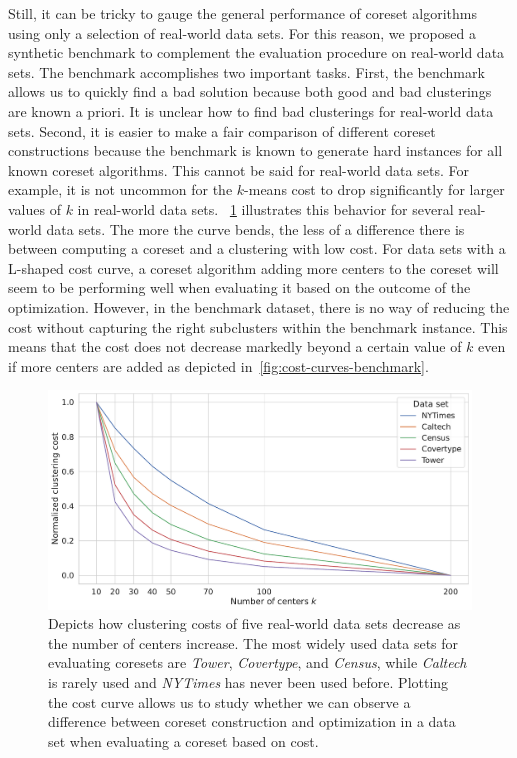 Still, it can be tricky to gauge the general performance of coreset algorithms using only a selection of real-world data sets. For this reason, we proposed a synthetic benchmark to complement the evaluation procedure on real-world data sets. The benchmark accomplishes two important tasks.
% 
First, the benchmark allows us to quickly find a bad solution because both good and bad clusterings are known a priori. It is unclear how to find bad clusterings for real-world data sets.
% 
Second, it is easier to make a fair comparison of different coreset constructions because the benchmark is known to generate hard instances for all known coreset algorithms. This cannot be said for real-world data sets.
%
For example, it is not uncommon for the $k$-means cost to drop significantly for larger values of $k$ in real-world data sets.
~\cref{fig:cost-curves-real-world-datasets} illustrates this behavior for several real-world data sets. The more the curve bends, the less of a difference there is between computing a coreset and a clustering with low cost. For data sets with a L-shaped cost curve, a coreset algorithm adding more centers to the coreset will seem to be performing well when evaluating it based on the outcome of the optimization. However, in the benchmark dataset, there is no way of reducing the cost without capturing the right subclusters within the benchmark instance. This means that the cost does not decrease markedly beyond a certain value of $k$ even if more centers are added as depicted in~\cref{fig:cost-curves-benchmark}.

\begin{figure}
  \caption{Depicts how clustering costs of five real-world data sets decrease as the number of centers increase. 
  The most widely used data sets for evaluating coresets are \textit{Tower}, \textit{Covertype}, and \textit{Census}, while \textit{Caltech} is rarely used and \textit{NYTimes} has never been used before.
  Plotting the cost curve allows us to study whether we can observe a difference between coreset construction and optimization in a data set when evaluating a coreset based on cost.
  }
  \label{fig:cost-curves-real-world-datasets}
  \includegraphics[width=1\linewidth]{figures/cost-curves-real-world-datasets.pdf}
\end{figure}


